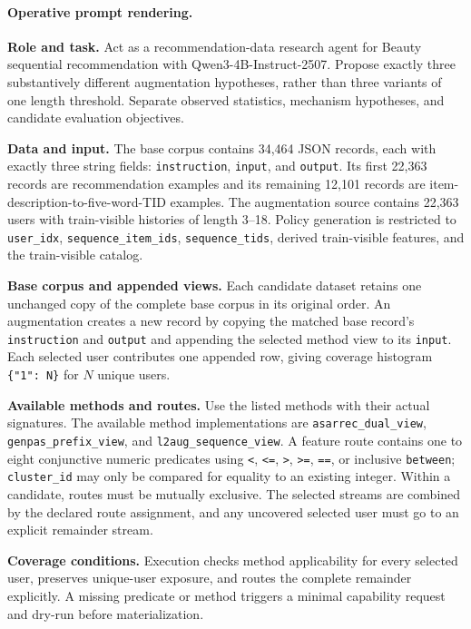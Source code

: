 \paragraph{Operative prompt rendering.}
\begingroup\footnotesize
\noindent\textbf{Role and task.}
Act as a recommendation-data research agent for Beauty sequential recommendation with Qwen3-4B-Instruct-2507. Propose exactly three substantively different augmentation hypotheses, rather than three variants of one length threshold. Separate observed statistics, mechanism hypotheses, and candidate evaluation objectives.

\noindent\textbf{Data and input.}
The base corpus contains 34,464 JSON records, each with exactly three string fields: \texttt{instruction}, \texttt{input}, and \texttt{output}. Its first 22,363 records are recommendation examples and its remaining 12,101 records are item-description-to-five-word-TID examples. The augmentation source contains 22,363 users with train-visible histories of length 3--18. Policy generation is restricted to \texttt{user\_idx}, \texttt{sequence\_item\_ids}, \texttt{sequence\_tids}, derived train-visible features, and the train-visible catalog.

\noindent\textbf{Base corpus and appended views.}
Each candidate dataset retains one unchanged copy of the complete base corpus in its original order. An augmentation creates a new record by copying the matched base record's \texttt{instruction} and \texttt{output} and appending the selected method view to its \texttt{input}. Each selected user contributes one appended row, giving coverage histogram \texttt{\{"1": N\}} for $N$ unique users.

\noindent\textbf{Available methods and routes.}
Use the listed methods with their actual signatures. The available method implementations are \texttt{asarrec\_dual\_view}, \texttt{genpas\_prefix\_view}, and \texttt{l2aug\_sequence\_view}. A feature route contains one to eight conjunctive numeric predicates using \texttt{<}, \texttt{<=}, \texttt{>}, \texttt{>=}, \texttt{==}, or inclusive \texttt{between}; \texttt{cluster\_id} may only be compared for equality to an existing integer. Within a candidate, routes must be mutually exclusive. The selected streams are combined by the declared route assignment, and any uncovered selected user must go to an explicit remainder stream.

\noindent\textbf{Coverage conditions.}
Execution checks method applicability for every selected user, preserves unique-user exposure, and routes the complete remainder explicitly. A missing predicate or method triggers a minimal capability request and dry-run before materialization.

